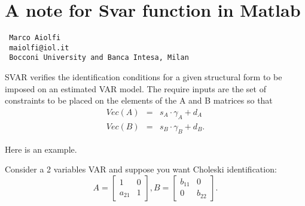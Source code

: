 \documentclass{article}
\begin{document}
\section{A note for Svar function in Matlab}

\noindent
\begin{verbatim}
 Marco Aiolfi
 maiolfi@iol.it
 Bocconi University and Banca Intesa, Milan
\end{verbatim}


SVAR verifies the identification conditions for a given structural form to
be imposed on an estimated VAR model. The require inputs are the set of
constraints to be placed on the elements of the A and B matrices so that
\begin{eqnarray}
Vec(A) &=&s_{A}\cdot \gamma _{A}+d_{A}  \label{res} \\
Vec(B) &=&s_{B}\cdot \gamma _{B}+d_{B}.  \nonumber
\end{eqnarray}

Here is an example.

Consider a 2 variables VAR and suppose you want Choleski identification:
\begin{equation}
A=\left[
\begin{array}{cc}
1 & 0 \\
a_{21} & 1
\end{array}
\right] ,B=\left[
\begin{array}{cc}
b_{11} & 0 \\
0 & b_{22}
\end{array}
\right] .
\end{equation}
\end{document}

